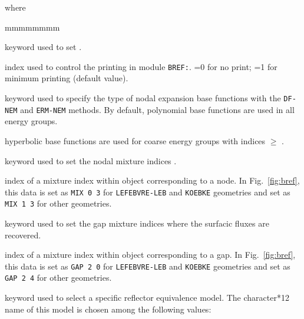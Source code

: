 \noindent where
\begin{ListeDeDescription}{mmmmmmmm}

\item[\moc{EDIT}] keyword used to set .

\item[\dusa{iprint}] index used to control the printing in module {\tt BREF:}. =0 for no print; =1 for minimum printing (default value).

\item[\moc{HYPE}] keyword used to specify the type of nodal expansion base functions with the {\tt DF-NEM} and {\tt ERM-NEM}
methods. By default, polynomial base functions are used in all energy groups.

\item[\dusa{igmax}] hyperbolic base functions are used for coarse energy groups with indices $\ge$ .

\item[\moc{MIX}] keyword used to set the nodal mixture indices .

\item[\dusa{imix}] index of a mixture index within object  corresponding to a node. In Fig.~\ref{fig:bref}, this data
is set as {\tt MIX 0 3} for {\tt LEFEBVRE-LEB} and {\tt KOEBKE} geometries and set as {\tt MIX 1 3} for other geometries.

\item[\moc{GAP}] keyword used to set the gap mixture indices  where the surfacic fluxes are recovered.

\item[\dusa{igap}] index of a mixture index within object  corresponding to a gap. In Fig.~\ref{fig:bref}, this data
is set as {\tt GAP 2 0} for {\tt LEFEBVRE-LEB} and {\tt KOEBKE} geometries and set as {\tt GAP 2 4} for other geometries.

\item[\moc{MODE}] keyword used to select a specific reflector equivalence model. The character*12 name of this model is chosen among the following values:


\end{ListeDeDescription}
